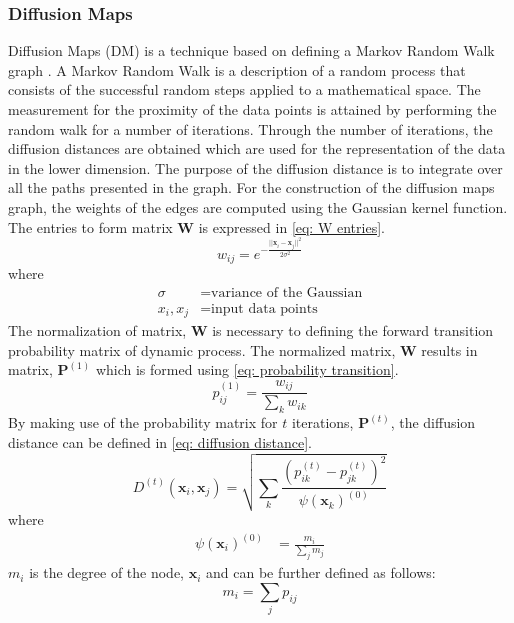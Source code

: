 \documentclass[11pt]{article}
\begin{document}
	\subsubsection{Diffusion Maps}
	Diffusion Maps (DM) is a technique based on defining a Markov Random Walk graph \cite{COIFMAN20065}. A Markov Random Walk is a description of a random process that consists of the successful random steps applied to a mathematical space. The measurement for the proximity of the data points is attained by performing the random walk for a number of iterations. Through the number of iterations, the diffusion distances are obtained which are used for the representation of the data in the lower dimension. The purpose of the diffusion distance is to integrate over all the paths presented in the graph. For the construction of the diffusion maps graph, the weights of the edges are computed using the Gaussian kernel function. The entries to form matrix \textbf{W} is expressed in \eqref{eq: W entries}.
	\begin{equation}
		w_{ij} = e^{-\frac{||\textbf{x}_i - \textbf{x}_j||^2}{2\sigma^2}}
		\label{eq: W entries}
	\end{equation}
	where
	\begin{align*}
		\sigma &= \text{variance of the Gaussian}\\
		x_i, x_j &= \text{input data points}
	\end{align*}
	The normalization of matrix, \textbf{W} is necessary to defining the forward transition probability matrix of dynamic process. The normalized matrix, \textbf{W} results in matrix, $\textbf{P}^{(1)}$ which is formed using \eqref{eq: probability transition}.
	\begin{equation}
		p_{ij}^{(1)} = \frac{w_{ij}}{\sum_{k}w_{ik}}
		\label{eq: probability transition}
	\end{equation}
	By making use of the probability matrix for $t$ iterations, $\textbf{P}^{(t)}$, the diffusion distance can be defined in \eqref{eq: diffusion distance}.
	\begin{equation}
		D^{(t)}(\textbf{x}_i, \textbf{x}_j) = \sqrt{\sum_{k}\frac{(p_{ik}^{(t)}-p_{jk}^{(t)})^2}{\psi(\textbf{x}_k)^{(0)}}}
		\label{eq: diffusion distance}
	\end{equation}
	where
	\begin{align*}
		\psi(\textbf{x}_i)^{(0)} &= \frac{m_i}{\sum_{j}m_j}
	\end{align*}
	$m_i$ is the degree of the node, $\textbf{x}_i$ and can be further defined as follows:
	\[m_i = \sum_{j}p_{ij}\]
\end{document}
